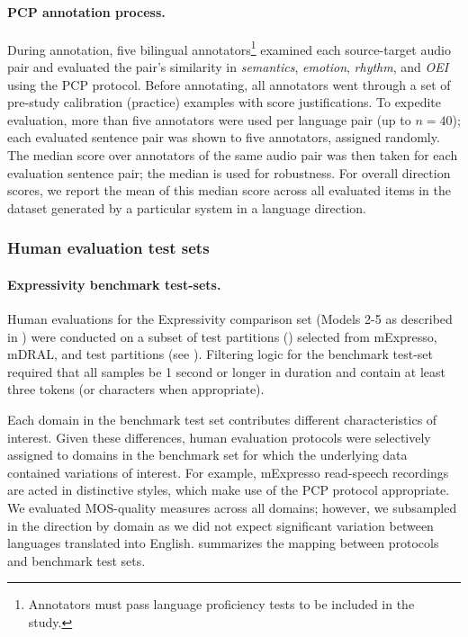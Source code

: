 \paragraph{PCP annotation process.} During annotation, five bilingual annotators\footnote{Annotators must pass language proficiency tests to be included in the study.} examined each source-target audio pair and evaluated the pair's similarity in \textit{semantics}, \textit{emotion}, \textit{rhythm}, and \textit{OEI} using the PCP protocol.  Before annotating, all annotators went through a set of pre-study calibration (practice) examples with score justifications. To expedite evaluation, more than five annotators were used per language pair (up to $n=40$); each evaluated sentence pair was shown to five annotators, assigned randomly. The median score over annotators of the same audio pair was then taken for each evaluation sentence pair; the median is used for robustness. For overall direction scores, we report the mean of this median score across all evaluated items in the dataset generated by a particular system in a language direction.

\subsubsection{Human evaluation test sets}


\label{sec:human_eval_test_sets}
\paragraph{Expressivity benchmark test-sets.} Human evaluations for the Expressivity comparison set (Models 2-5 as described in ) were conducted on a subset of test partitions () selected from mExpresso, mDRAL, and \fleurs test partitions (see ). Filtering logic for the benchmark test-set required that all samples be 1 second or longer in duration and contain at least three tokens (or characters when appropriate).

Each domain in the benchmark test set contributes different characteristics of interest. Given these differences, human evaluation protocols were selectively assigned to domains in the benchmark set for which the underlying data contained variations of interest. For example, mExpresso read-speech recordings are acted in distinctive styles, which make use of the PCP protocol appropriate. We evaluated MOS-quality measures across all domains; however, we subsampled in the \xeng direction by domain as we did not expect significant variation between languages translated into English.  summarizes the mapping between protocols and benchmark test sets.

